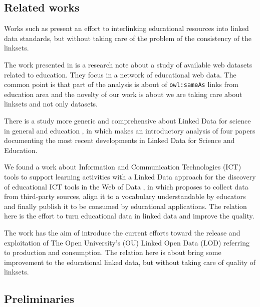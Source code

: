 \subsection{Related works}

Works such as \cite{rajabi2015interlinking,dietze2013interlinking,Dietze:2012:LEI:2245276.2245347} present an effort to interlinking educational resources into linked data standards, but without taking care of the problem of the consistency of the linksets.

The work presented in \cite{d2013assessing} is a research note about a study of available web datasets related to education. They focus in a network of educational web data. The common point is that part of the analysis is about of \texttt{owl:sameAs} links from education area and the novelty of our work is about we are taking care about linksets and not only datasets.
    
There is a study more generic and comprehensive about Linked Data for science in general and education \cite{kessler2013linked}, in which makes an introductory analysis of four papers documenting the most recent developments in Linked Data for Science and Education.

We found a work about Information and Communication Technologies (ICT) tools to support learning activities with a Linked Data approach for the discovery of educational ICT tools in the Web of Data \cite{ruiz2012linked}, in which proposes to collect data from third-party sources, align it to a vocabulary understandable by educators and finally publish it to be consumed by educational applications. The relation here is the effort to turn educational data in linked data and improve the quality.

The work \cite{zablith2011linked} has the aim of introduce the current efforts toward the release and exploitation of The Open University’s (OU) Linked Open Data (LOD) referring to production and consumption. The relation here is about bring some improvement to the educational linked data, but without taking care of quality of linksets.

\subsection{Preliminaries} \label{preliminaries}



